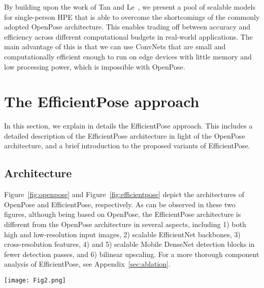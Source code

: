 By building upon the work of Tan and Le~\cite{tan2019efficientnet}, we present a pool of scalable models for single-person HPE that is able to overcome the shortcomings of the commonly adopted OpenPose architecture. This enables trading off between accuracy and efficiency across different computational budgets in real-world applications. The main advantage of this is that we can use ConvNets that are small and computationally efficient enough to run on edge devices with little memory and low processing power, which is impossible with OpenPose. 

\section{The EfficientPose approach}
\label{sec:efficientpose}

In this section, we explain in details the EfficientPose approach. This includes a detailed description of the EfficientPose architecture in light of the OpenPose architecture, and a brief introduction to the proposed variants of EfficientPose.

\subsection{Architecture}
\label{sec:architecture}
Figure~\ref{fig:openpose} and Figure~\ref{fig:efficientpose} depict the architectures of OpenPose and EfficientPose, respectively. As can be observed in these two figures, although being based on OpenPose, the EfficientPose architecture is different from the OpenPose architecture in several aspects, including 1) both high and low-resolution input images, 2) scalable EfficientNet backbones, 3) cross-resolution features, 4) and 5) scalable Mobile DenseNet detection blocks in fewer detection passes, and 6) bilinear upscaling. For a more thorough component analysis of EfficientPose, see Appendix~\ref{sec:ablation}.

\begin{figure*}
\begin{center}
\texttt{[image: Fig2.png]}
\caption{Proposed architecture comprising 1a) high-resolution and 1b) low-resolution inputs, 2a) high-level and 2b) low-level EfficientNet backbones combined into 3) cross-resolution features, 4) Mobile DenseNet detection blocks, 1+2 passes for estimation of part affinity fields (5a) and confidence maps (5b and 5c), and 6) bilinear upscaling}
\label{fig:efficientpose}     
\end{center}
\end{figure*}

